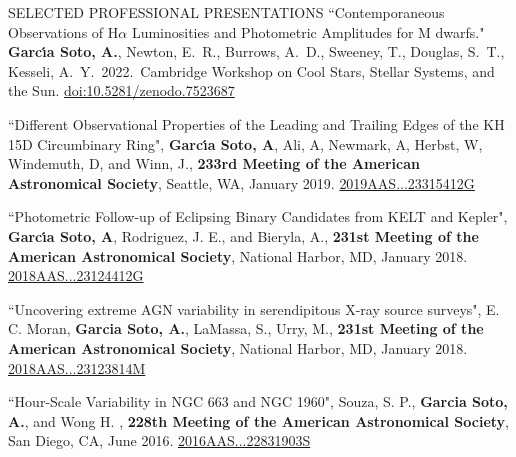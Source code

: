 \documentclass{resume} %
\begin{document}
\begin{rSection}{SELECTED PROFESSIONAL PRESENTATIONS}
\sloppy ``Contemporaneous Observations of H{\ensuremath{\alpha}} Luminosities and Photometric Amplitudes for M dwarfs." \textbf{Garc{\'\i}a Soto, A.}, Newton, E.~R., Burrows, A.~D., Sweeney, T., Douglas, S.~T., Kesseli, A.~Y.\ 2022.\ Cambridge Workshop on Cool Stars, Stellar Systems, and the Sun. \href{https://zenodo.org/record/7523687#.ZEqKAuzMI-Q}{doi:10.5281/zenodo.7523687}

``Different Observational Properties of the Leading and Trailing Edges of the KH 15D Circumbinary Ring", \textbf{Garc{\'\i}a Soto, A}, Ali, A, Newmark, A, Herbst, W, Windemuth, D, and Winn, J., \textbf{233rd Meeting of the American Astronomical Society}, Seattle, WA, January 2019. \href{https://ui.adsabs.harvard.edu/abs/2019AAS...23315412G/abstract}{2019AAS...23315412G}

``Photometric Follow-up of Eclipsing Binary Candidates from KELT and Kepler", \textbf{Garc{\'\i}a Soto, A}, Rodriguez, J. E., and Bieryla, A., \textbf{231st Meeting of the American Astronomical Society}, National Harbor, MD, January 2018. \href{https://ui.adsabs.harvard.edu/abs/2018AAS...23124412G/abstract}{2018AAS...23124412G}

``Uncovering extreme AGN variability in serendipitous X-ray source surveys", E. C. Moran, \textbf{Garcia Soto, A.}, LaMassa, S., Urry, M., \textbf{231st Meeting of the American Astronomical Society}, National Harbor, MD, January 2018. \href{https://ui.adsabs.harvard.edu/abs/2018AAS...23123814M/abstract}{2018AAS...23123814M}

``Hour-Scale Variability in NGC 663 and NGC 1960", Souza, S. P., \textbf{Garcia Soto, A.}, and Wong H. , \textbf{228th Meeting of the American Astronomical Society}, San Diego, CA, June 2016. \href{https://ui.adsabs.harvard.edu/abs/2016AAS...22831903S/abstract}{2016AAS...22831903S}\\
\end{rSection}
\end{document}
